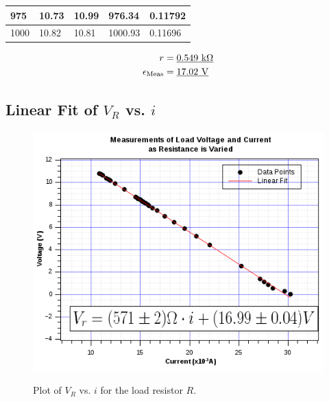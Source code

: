 \documentclass[twocolumn,english]{IEEEtran}
\theoremstyle{plain}
\theoremstyle{plain}
\begin{document}
\begin{table}[htpb]
\begin{tabular}{|l|l|l|l|l|}
975                                                                                              & 10.73                                                                               & 10.99                                                                                & 976.34                                                                                               & 0.11792                              \\ \hline
1000                                                                                             & 10.82                                                                               & 10.81                                                                                & 1000.93                                                                                              & 0.11696                              \\ \hline
\end{tabular}
\end{table}


\begin{align*}
 r &= \text{\underline{0.549 k$\Omega$}} \\
 \epsilon_{\text{Meas}} &= \text{\underline{17.02 V}}
\end{align*}

  \subsection{\textbf{Linear Fit of $V_R$ vs. $i$}}

  \begin{figure}[htpb]
  \begin{centering}
  \begin{center}
  \includegraphics[width=\linewidth]{./vi_graph.png}
  \label{fig:vigraph}
  \caption{Plot of $V_R$ vs. $i$ for the load resistor $R$.}
  \end{center}
  \par\end{centering}
  \end{figure}
\end{document}
